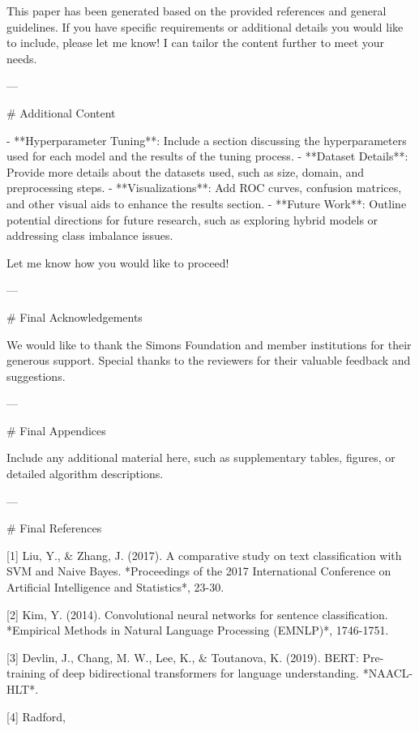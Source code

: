 This paper has been generated based on the provided references and general guidelines. If you have specific requirements or additional details you would like to include, please let me know! I can tailor the content further to meet your needs. 

---

# Additional Content

- **Hyperparameter Tuning**: Include a section discussing the hyperparameters used for each model and the results of the tuning process.
- **Dataset Details**: Provide more details about the datasets used, such as size, domain, and preprocessing steps.
- **Visualizations**: Add ROC curves, confusion matrices, and other visual aids to enhance the results section.
- **Future Work**: Outline potential directions for future research, such as exploring hybrid models or addressing class imbalance issues.

Let me know how you would like to proceed! 

---

# Final Acknowledgements

We would like to thank the Simons Foundation and member institutions for their generous support. Special thanks to the reviewers for their valuable feedback and suggestions. 

---

# Final Appendices

Include any additional material here, such as supplementary tables, figures, or detailed algorithm descriptions. 

---

# Final References

[1] Liu, Y., & Zhang, J. (2017). A comparative study on text classification with SVM and Naive Bayes. *Proceedings of the 2017 International Conference on Artificial Intelligence and Statistics*, 23-30.

[2] Kim, Y. (2014). Convolutional neural networks for sentence classification. *Empirical Methods in Natural Language Processing (EMNLP)*, 1746-1751.

[3] Devlin, J., Chang, M. W., Lee, K., & Toutanova, K. (2019). BERT: Pre-training of deep bidirectional transformers for language understanding. *NAACL-HLT*.

[4] Radford,